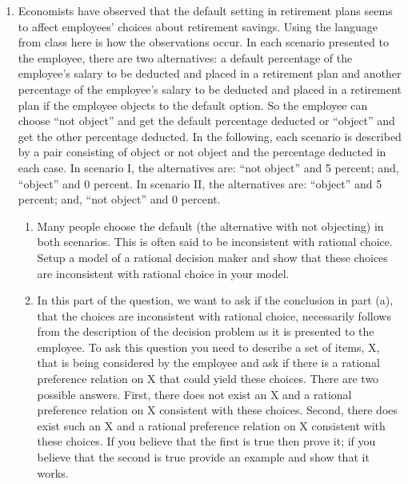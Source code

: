\documentclass[12pt]{article}
\begin{document}
\begin{enumerate}
	\item Economists have observed that the default setting in retirement plans seems to affect employees' choices about retirement savings. Using the language from class here is how the observations occur. In each scenario presented to the employee, there are two alternatives: a default percentage of the employee's salary to be deducted and placed in a retirement plan and another percentage of the employee's salary to be deducted and placed in a retirement plan if the employee objects to the default option. So the employee can choose ``not object'' and get the default percentage deducted or ``object'' and get the other percentage deducted. In the following, each scenario is described by a pair consisting of object or not object and the percentage deducted in each case. In scenario I, the alternatives are: ``not object'' and 5 percent; and, ``object'' and 0 percent. In scenario II, the alternatives are: ``object'' and 5 percent; and, ``not object'' and 0 percent.
	\begin{enumerate}
		\item Many people choose the default (the alternative with not objecting) in both scenarios. This is often said to be inconsistent with rational choice. Setup a model of a rational decision maker and show that these choices are inconsistent with rational choice in your model.
		\item In this part of the question, we want to ask if the conclusion in part (a), that the choices are inconsistent with rational choice, necessarily follows from the description of the decision problem as it is presented to the employee. To ask this question you need to describe a set of items, X, that is being considered by the employee and ask if there is a rational preference relation on X that could yield these choices. There are two possible answers. First, there does not exist an X and a rational preference relation on X consistent with these choices. Second, there does exist such an X and a rational preference relation on X consistent with these choices. If you believe that the first is true then prove it; if you believe that the second is true provide an example and show that it works.

\end{enumerate}
\end{enumerate}
\end{document}
